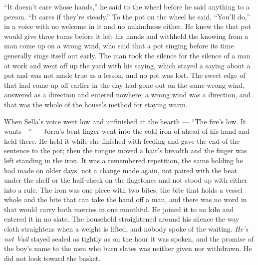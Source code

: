 “It doesn't care whose hands,” he said to the wheel before he said anything to a person. “It cares if they're steady.” To the pot on the wheel he said, “You'll do,” in a voice with no welcome in it and no unkindness either. He knew the  that pot would give three turns before it left his hands and withheld the knowing from a man come up on a wrong wind, who said that a pot singing before its time generally sings itself out early. The man took the silence for the silence of a man at work and went off up the yard with his saying, which stayed a saying about a pot and was not made true as a lesson, and no pot was lost. The sweet edge of  that had come up off  earlier in the day had gone out on the same wrong wind, answered as a direction and entered nowhere; a wrong wind was a direction, and that was the whole of the house's method for staying warm.

When Sella's voice went low and unfinished at the hearth --- “The fire's low. It wants---” --- Jorra's bent finger went into the cold iron of  ahead of his hand and held there. He held it while she finished with feeding and gave the end of the sentence to the pot; then the tongue moved a hair's breadth and the finger was left standing in the iron. It was a remembered repetition, the same holding he had made on older days, not a change made again, not paired with the beat under the shelf or the half-check on the flagstones and not stood up with either into a rule. The iron was one piece with two bites, the bite that holds a vessel whole and the bite that can take the hand off a man, and there was no word in  that would carry both mercies in one mouthful. He joined it to no kiln and entered it in no slate. The household straightened around his silence the way cloth straightens when a weight is lifted, and nobody spoke of the waiting. \emph{He's not Vail} stayed sealed as tightly as on the hour it was spoken, and the promise of the boy's name to the men who burn slates was neither given nor withdrawn. He did not look toward the basket.

\scenebreak

